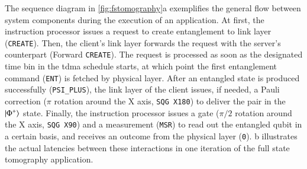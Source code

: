 The sequence diagram in \cref{fig:fstomography}a exemplifies the general flow between system
components during the execution of an application. At first, the instruction processor issues a
request to create entanglement to link layer (\texttt{CREATE}). Then, the client's link layer
forwards the request with the server's counterpart (Forward \texttt{CREATE}). The request is
processed as soon as the designated time bin in the \acrshort{tdma} schedule starts, at which point
the first entanglement command (\texttt{ENT}) is fetched by physical layer. After an entangled state
is produced successfully (\texttt{PSI\_PLUS}), the link layer of the client issues, if needed, a
Pauli correction ($\pi$ rotation around the X axis, \texttt{SQG X180}) to deliver the pair in the
$\ket{\Phi^+}$ state. Finally, the instruction processor issues a gate ($\pi/2$ rotation around the
X axis, \texttt{SQG X90}) and a measurement (\texttt{MSR}) to read out the entangled qubit in a
certain basis, and receives an outcome from the physical layer (\texttt{0}).
b illustrates the actual latencies between these interactions in one
iteration of the full state tomography application.


